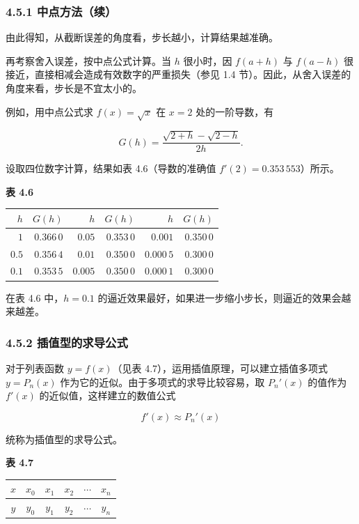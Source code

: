 \documentclass[
  10pt,
  fontset=fandol]{ctexart}
\newcounter{none} %
\begin{document}
\subsubsection{4.5.1 中点方法（续）}\label{ux4e2dux70b9ux65b9ux6cd5ux7eed}

由此得知，从截断误差的角度看，步长越小，计算结果越准确。

再考察舍入误差，按中点公式计算。当 \(h\) 很小时，因 \(f(a+h)\) 与 \(f(a-h)\) 很接近，直接相减会造成有效数字的严重损失（参见 1.4 节）。因此，从舍入误差的角度来看，步长是不宜太小的。

例如，用中点公式求 \(f(x)=\sqrt{x}\) 在 \(x=2\) 处的一阶导数，有

\[
G(h)=\frac{\sqrt{2+h}-\sqrt{2-h}}{2h}.
\]

设取四位数字计算，结果如表 4.6（导数的准确值 \(f'(2)=0.353\,553\)）所示。

\textbf{表 4.6}

{\def\LTcaptype{none} %
\begin{longtable}[]{@{}rrrrrr@{}}
\toprule\noalign{}
\(h\) & \(G(h)\) & \(h\) & \(G(h)\) & \(h\) & \(G(h)\) \\
\midrule\noalign{}
\endhead
\bottomrule\noalign{}
\endlastfoot
\(1\) & \(0.366\,0\) & \(0.05\) & \(0.353\,0\) & \(0.001\) & \(0.350\,0\) \\
\(0.5\) & \(0.356\,4\) & \(0.01\) & \(0.350\,0\) & \(0.000\,5\) & \(0.300\,0\) \\
\(0.1\) & \(0.353\,5\) & \(0.005\) & \(0.350\,0\) & \(0.000\,1\) & \(0.300\,0\) \\
\end{longtable}
}

在表 4.6 中，\(h=0.1\) 的逼近效果最好，如果进一步缩小步长，则逼近的效果会越来越差。

\subsubsection{4.5.2 插值型的求导公式}\label{ux63d2ux503cux578bux7684ux6c42ux5bfcux516cux5f0f}

对于列表函数 \(y=f(x)\)（见表 4.7），运用插值原理，可以建立插值多项式 \(y=P_n(x)\) 作为它的近似。由于多项式的求导比较容易，取 \(P_n'(x)\) 的值作为 \(f'(x)\) 的近似值，这样建立的数值公式

\[
f'(x)\approx P_n'(x)
\tag{4.5.1}
\]

统称为插值型的求导公式。

\textbf{表 4.7}

{\def\LTcaptype{none} %
\begin{longtable}[]{@{}cccccc@{}}
\toprule\noalign{}
\(x\) & \(x_0\) & \(x_1\) & \(x_2\) & \(\cdots\) & \(x_n\) \\
\midrule\noalign{}
\endhead
\bottomrule\noalign{}
\endlastfoot
\(y\) & \(y_0\) & \(y_1\) & \(y_2\) & \(\cdots\) & \(y_n\) \\
\end{longtable}
}
\end{document}
